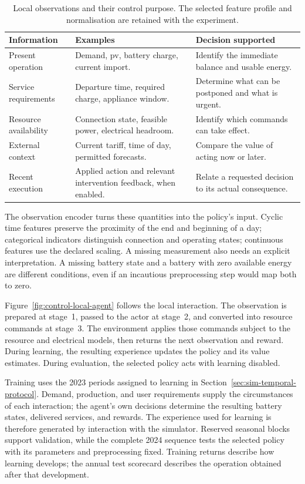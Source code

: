 \begin{table}[htbp]
\centering
\caption{Local observations and their control purpose. The selected feature profile and normalisation are retained with the experiment.}
\label{tab:control-observation-roles}
\small
\begin{tabularx}{\textwidth}{@{}p{}XX@{}}
\toprule
\textbf{Information} & \textbf{Examples} & \textbf{Decision supported}\\
\midrule
Present operation & Demand, \gls{pv}, battery charge, current import. & Identify the immediate balance and usable energy.\\
\addlinespace
Service requirements & Departure time, required charge, appliance window. & Determine what can be postponed and what is urgent.\\
\addlinespace
Resource availability & Connection state, feasible power, electrical headroom. & Identify which commands can take effect.\\
\addlinespace
External context & Current tariff, time of day, permitted forecasts. & Compare the value of acting now or later.\\
\addlinespace
Recent execution & Applied action and relevant intervention feedback, when enabled. & Relate a requested decision to its actual consequence.\\
\bottomrule
\end{tabularx}
\end{table}

The observation encoder turns these quantities into the policy's input. Cyclic time features preserve the proximity of the end and beginning of a day; categorical indicators distinguish connection and operating states; continuous features use the declared scaling. A missing measurement also needs an explicit interpretation. A missing battery state and a battery with zero available energy are different conditions, even if an incautious preprocessing step would map both to zero.

Figure~\ref{fig:control-local-agent} follows the local interaction. The observation is prepared at stage~1, passed to the actor at stage~2, and converted into resource commands at stage~3. The environment applies those commands subject to the resource and electrical models, then returns the next observation and reward. During learning, the resulting experience updates the policy and its value estimates. During evaluation, the selected policy acts with learning disabled.

Training uses the 2023 periods assigned to learning in Section~\ref{sec:sim-temporal-protocol}. Demand, production, and user requirements supply the circumstances of each interaction; the agent's own decisions determine the resulting battery states, delivered services, and rewards. The experience used for learning is therefore generated by interaction with the simulator. Reserved seasonal blocks support validation, while the complete 2024 sequence tests the selected policy with its parameters and preprocessing fixed. Training returns describe how learning develops; the annual test scorecard describes the operation obtained after that development.

